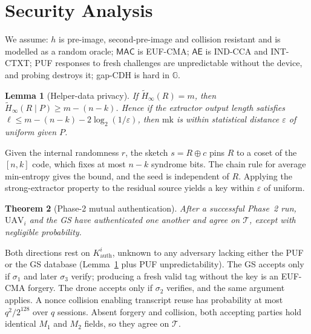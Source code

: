 \documentclass[conference]{IEEEtran}
\newtheorem{theorem}{Theorem}
\newtheorem{lemma}[theorem]{Lemma}
\begin{document}
\section{Security Analysis}
\label{sec:security}

We assume: $h$ is pre-image, second-pre-image and collision resistant and is
modelled as a random oracle; $\mathsf{MAC}$ is EUF-CMA; $\mathsf{AE}$ is IND-CCA
and INT-CTXT; PUF responses to fresh challenges are unpredictable without the
device, and probing destroys it; gap-CDH is hard in $\mathbb{G}$.

\begin{lemma}[Helper-data privacy]
\label{lem:helper}
If $\widetilde{H}_\infty(R) = m$, then
$\widetilde{H}_\infty(R \mid P) \ge m - (n-k)$. Hence if the extractor output
length satisfies $\ell \le m - (n-k) - 2\log_2(1/\varepsilon)$, then
$\text{mk}$ is within statistical distance $\varepsilon$ of uniform given $P$.
\end{lemma}

\begin{IEEEproof}
Given the internal randomness $r$, the sketch $s = R \oplus c$ pins $R$ to a
coset of the $[n,k]$ code, which fixes at most $n-k$ syndrome bits. The chain
rule for average min-entropy gives the bound, and the seed is independent of
$R$. Applying the strong-extractor property to the residual source yields a key
within $\varepsilon$ of uniform.
\end{IEEEproof}

\begin{theorem}[Phase-2 mutual authentication]
\label{thm:mutual}
After a successful Phase~2 run, $\text{UAV}_i$ and the GS have authenticated one
another and agree on $\mathcal{T}$, except with negligible probability.
\end{theorem}

\begin{IEEEproof}
Both directions rest on $K^{i}_{\text{auth}}$, unknown to any adversary lacking
either the PUF or the GS database (Lemma~\ref{lem:helper} plus PUF
unpredictability). The GS accepts only if $\sigma_1$ and later $\sigma_3$
verify; producing a fresh valid tag without the key is an EUF-CMA forgery. The
drone accepts only if $\sigma_2$ verifies, and the same argument applies. A
nonce collision enabling transcript reuse has probability at most $q^2/2^{128}$
over $q$ sessions. Absent forgery and collision, both accepting parties hold
identical $M_1$ and $M_2$ fields, so they agree on $\mathcal{T}$.
\end{IEEEproof}
\end{document}
